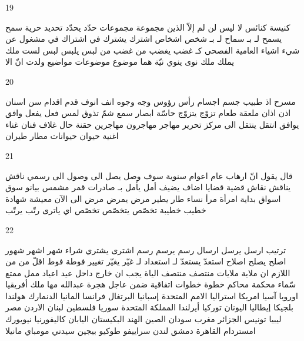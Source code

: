\documentclass[twocolumn,a4paper]{article}
\begin{document}
19

\textarabic{ كنيسة  كنائس  
 لا ليس  لن لم إلاّ  
 الذين  
 مجموعة  مجموعات
 حدّد  يحدّد  
 تحديد  
 حرية  
 سمح  يسمح لـ بـ  
 سماح لـ بـ  
 شخص  اشخاص  
 اشترك  يشترك في  
 اشتراك في  
 مشغول عن  
 شيء  اشياء  
 العامية  
 الفصحى  
 كـ  
 غضب  يغضب من   
 غضب من  
 لبس  يلبس  
 لبس  
 لست  
 ملك  يملك  
 ملك  
 نوى  ينوي  
 نيّة  
 هما  
 موضوع  موضوعات
 مواضيع  
 ولدت  
 انّ  
 الا  
}

20

\textarabic{ مسرح  
 اذ  
 طبيب  
 جسم  اجسام  
 رأس  رؤوس  
 وجه  وجوه  
 انف  انوف  
 قدم  اقدام  
 سن  اسنان  
 اذن  اذان  
 ملعقة  
 طعام  
 تزوّج  يتزوّج  
 حاسّة  
 ابصار  
 سمع  
 شمّ  
 تذوق  
 لمس  
 فعل  يفعل  
 وافق  يوافق  
 انتقل  ينتقل الى 
 مركز  
 تحرير  
 مهاجر  مهاجرون
  مهاجرين
  حقنة  
 حال  
 غلاف  
 فنان  
 غناء  
 اغنية  
 حيوان  حيوانات
 مطار  
 طيران  
}

21

\textarabic{ قال  يقول انّ  
 ارهاب  
 عام  اعوام  
 سنوية  
 سوف  
 وصل  يصل الى  
 وصول الى  
 رسمي  
 ناقش  يناقش  
 نقاش  
 قضية  قضايا  
 اضاف  يضيف  
 أمل  يأمل بـ  
 صادرات  
 قمر  
 مشمس  
 بيانو  
 سوق  اسواق  
 بداية  
 امرأة  مرأ  
 نساء  
 طار  يطير  
 مرض  يمرض  
 مرض  
 الى اﻵن  
 معيشة  
 شهادة  
 خطيب  خطيبة  
 تخصّص  يتخصّص  
 تخصّص  
 اي  
 ياترى  
 رتّب  يرتّب  
}

22

\textarabic{ ترتيب  
 ارسل  يرسل  
 ارسال  
 رسم  يرسم  
 رسم  
 اشترى  يشتري  
 شراء  
 شهر  اشهر  شهور  
 اصلح  يصلح  
 اصلاح  
 استعدّ  يستعدّ لـ  
 استعداد لـ  
 غيّر  يغيّر  
 تغيير  
 فوطة  فوط  
 اقلّ من  
 من اللازم ان  
 ملاية  ملايات
 منتصف  
 منتصف الياة  
 يجب ان  
 خارج  
 داحل  
 عيد  اعياد  
 ممل  
 ممتع  
 سّماء  
 محكمة  محاكم  
 خطوة  خطوات
 اتفاقية  
 ضمن  
 عاجل  
 هجرة  
}\clearpage
\textarabic{
 عبدالله  
 مها  
 ملك  
}\clearpage
\textarabic{
 أفريقيا  
 اوروبا  
 آسيا  
 امريكا  
 استراليا  
 اﻻمم المتحدة  
 إسبانيا  
 البرتغال  
 فرانسا  
 المانيا  
  الدنمارك 
 هولندا  
 بلجيكا  
 إيطاليا  
 اليونان  
 توركيا  
 أيرلندا  
 المملكة المتحدة 
 سوريا  
 فلسطين  
 لبنان  
 الاردن  
 مصر  
 ليبيا  
 تونيس  
 الجزائر  
 مغرب  
 سودان  
 الصين  
 الهند  
 البكيستان  
 اليابان  
 كاليفورنيا  
 نيويورك  
 امستردام  
 القاهرة  
 دمشق  
 لندن  
 سراييفو  
 طوكيو  
 بيجين  
 سيدني  
 مومباي  
 مانيلا  
}
\end{document}
